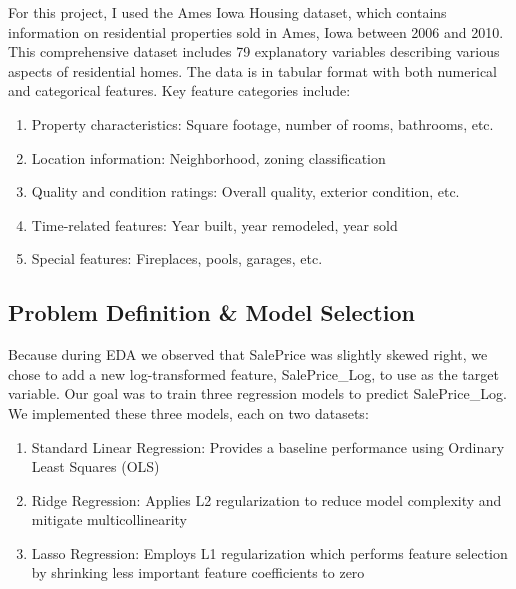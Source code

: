 \documentclass{article}
\begin{document}
For this project, I used the Ames Iowa Housing dataset, which contains information on residential properties sold in Ames, Iowa between 2006 and 2010. This comprehensive dataset includes 79 explanatory variables describing various aspects of residential homes. The data is in tabular format with both numerical and categorical features. Key feature categories include:
\begin{enumerate}
    \item Property characteristics: Square footage, number of rooms, bathrooms, etc.
    \item Location information: Neighborhood, zoning classification
    \item Quality and condition ratings: Overall quality, exterior condition, etc.
    \item Time-related features: Year built, year remodeled, year sold
    \item Special features: Fireplaces, pools, garages, etc.
\end{enumerate}



\subsection{Problem Definition \& Model Selection}

Because during EDA we observed that SalePrice was slightly skewed right, we chose to add a new log-transformed feature, SalePrice\_Log, to use as the target variable. Our goal was to train three regression models to predict SalePrice\_Log. We implemented these three models, each on two datasets:
\begin{enumerate}
    \item Standard Linear Regression: Provides a baseline performance using Ordinary Least Squares (OLS)
    \item Ridge Regression: Applies L2 regularization to reduce model complexity and mitigate multicollinearity
    \item Lasso Regression: Employs L1 regularization which performs feature selection by shrinking less important feature coefficients to zero
\end{enumerate}
\end{document}
